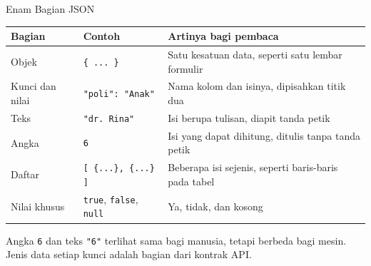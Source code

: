 \documentclass[aspectratio=169, table, 12pt]{beamer}
\begin{document}
\begin{frame}{{\Large Enam Bagian JSON}}
  \footnotesize
  \begin{tabularx}{\textwidth}{>{\raggedright\arraybackslash}p{2.6cm}
      >{\raggedright\arraybackslash}p{4.2cm}
      >{\raggedright\arraybackslash}X}
    \hline
    \textbf{Bagian} & \textbf{Contoh} & \textbf{Artinya bagi pembaca} \\ \hline
    Objek & \texttt{\{ ... \}} & Satu kesatuan data, seperti satu lembar formulir \\ \hline
    Kunci dan nilai & \texttt{"poli": "Anak"} & Nama kolom dan isinya, dipisahkan titik dua \\ \hline
    Teks & \texttt{"dr. Rina"} & Isi berupa tulisan, diapit tanda petik \\ \hline
    Angka & \texttt{6} & Isi yang dapat dihitung, ditulis tanpa tanda petik \\ \hline
    Daftar & \texttt{[ \{...\}, \{...\} ]} & Beberapa isi sejenis, seperti baris-baris pada tabel \\ \hline
    Nilai khusus & \texttt{true}, \texttt{false}, \texttt{null} & Ya, tidak, dan kosong \\ \hline
  \end{tabularx}

  \vspace{6pt}
  \small Angka \texttt{6} dan teks \texttt{"6"} terlihat sama bagi manusia, tetapi berbeda bagi mesin. Jenis data setiap kunci adalah bagian dari kontrak API.
\end{frame}
\end{document}
